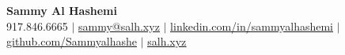\begin{center}
    \textbf{\Huge Sammy Al Hashemi} \\ \vspace{1pt}
    \small 917.846.6665 $|$     \href{mailto:sammy@salh.xyz}{\underline{sammy@salh.xyz}} $|$
    \href{https://linkedin.com/in/sammyalhashemi}{\underline{linkedin.com/in/sammyalhashemi}} $|$
    \href{https://github.com/Sammyalhashe}{\underline{github.com/Sammyalhashe}} $|$
    \href{https://salh.xyz}{\underline{salh.xyz}}
\end{center}
